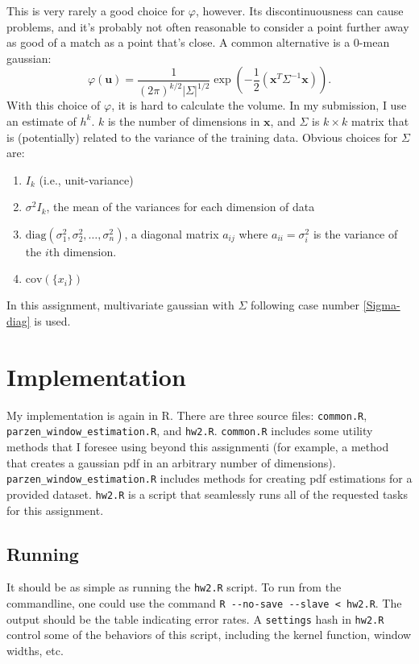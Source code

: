 \documentclass{article}
\begin{document}
This is very rarely a good choice for $\varphi$, however. Its discontinuousness
can cause problems, and it's probably not often reasonable to consider a point
further away as good of a match as a point that's close. A common alternative is
a 0-mean gaussian:
\[
	\varphi(\mathbf{u}) = \frac{1}{(2\pi)^{k/2}|\Sigma|^{1/2}} 
		\exp\left( -\frac{1}{2}\left(\mathbf{x}^{T} \Sigma^{-1}
		\mathbf{x}\right) \right).
\]
With this choice of $\varphi$, it is hard to calculate the volume. In my
submission, I use an estimate of $h^k$. $k$ is the number of dimensions in
$\mathbf{x}$, and $\Sigma$ is $k \times k$ matrix that is (potentially) related
to the variance of the training data.  Obvious choices for $\Sigma$ are:
\begin{enumerate}
	\item $I_k$ (i.e., unit-variance)
	\item $\sigma^2 I_k$, the mean of the variances for each dimension of data
	\item \label{Sigma-diag}
	$\mbox{diag}\left( \sigma_1^2, \sigma_2^2, \dots, \sigma_n^2 \right)$,
	a diagonal matrix ${a_{ij}}$ where $a_{ii}=\sigma_i^2$ is the variance of
	the $i$th dimension.
	\item $\mbox{cov}\left( \{x_i\} \right)$
\end{enumerate}
In this assignment, multivariate gaussian with $\Sigma$ following case number
\ref{Sigma-diag} is used.

\section{Implementation}

My implementation is again in R. There are three source files: \verb|common.R|,
\verb|parzen_window_estimation.R|, and \verb|hw2.R|. \verb|common.R| includes
some utility methods that I foresee using beyond this assignmenti (for example,
a method that creates a gaussian pdf in an arbitrary number of dimensions).
\verb|parzen_window_estimation.R| includes methods for creating pdf estimations
for a provided dataset. \verb|hw2.R| is a script that seamlessly runs all of
the requested tasks for this assignment.

\subsection{Running}

It should be as simple as running the \verb|hw2.R| script. To run from the
commandline, one could use the command \verb|R --no-save --slave < hw2.R|. The
output should be the table indicating error rates. A \verb|settings| hash in
\verb|hw2.R| control some of the behaviors of this script, including the
kernel function, window widths, etc.
\end{document}
